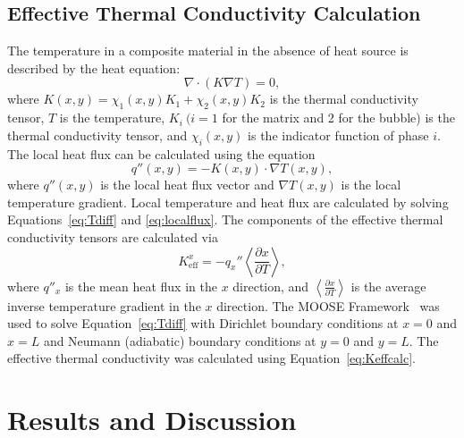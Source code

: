 \subsection*{Effective Thermal Conductivity Calculation}
\label{subsec:Keffcalc}
The temperature in a composite material in the absence of heat source is described by the heat equation:
\begin{equation}
\nabla \cdot \left(K\nabla T \right)=0,
\label{eq:Tdiff}
\end{equation}
where $K(x,y)=\chi_1(x,y)K_1 + \chi_2(x,y)K_2$ is the thermal conductivity tensor, $T$ is the temperature, $K_i\ { }(i=1$ for the matrix and 2 for the bubble) is the thermal conductivity tensor, and $\chi_i(x,y)$ is the indicator function of phase $i$. The local heat flux can be calculated using the equation
\begin{equation}
\label{eq:localflux}
q''(x,y) = -K(x,y) \cdot \nabla T(x,y),
\end{equation}
where $q''(x,y)$ is the local heat flux vector and $\nabla T(x,y)$ is the local temperature gradient. Local temperature and heat flux are calculated by solving Equations~\eqref{eq:Tdiff} and \eqref{eq:localflux}. The components of the effective thermal conductivity tensors are calculated via 
\begin{equation}
\label{eq:Keffcalc}
K_{\text{eff}}^x = -q_x''\left<\frac{\partial x}{\partial T}\right> ,
\end{equation}
where $q''_x$ is the mean heat flux in the $x$ direction, and $\left<\frac{\partial x}{\partial T}\right>$ is the average inverse temperature gradient in the $x$ direction. The MOOSE Framework~\cite{gaston2009moose} was used to solve Equation~\eqref{eq:Tdiff} with Dirichlet boundary conditions at $x=0$ and $x=L$ and Neumann (adiabatic) boundary conditions at $y=0$ and $y=L$. The effective thermal conductivity was calculated using Equation~\eqref{eq:Keffcalc}.



\section{\label{sec:results}Results and Discussion}

